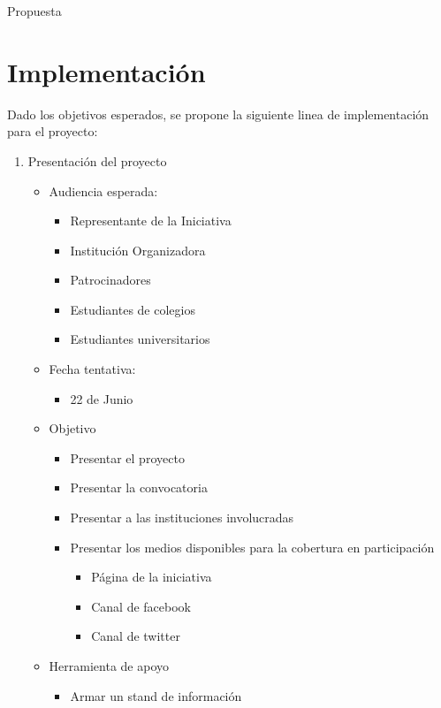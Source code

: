 \documentclass{article}
\begin{document}
Propuesta



\section{Implementación}

Dado los objetivos esperados, se propone la siguiente linea de implementación para el proyecto:

\begin{enumerate}
\item Presentación del proyecto
\begin{itemize}
\item Audiencia esperada:
\begin{itemize}
\item Representante de la Iniciativa
\item Institución Organizadora
\item Patrocinadores
\item Estudiantes de colegios
\item Estudiantes universitarios
\end{itemize}
\item Fecha tentativa:
\begin{itemize}
\item 22 de Junio
\end{itemize}
\item Objetivo
\begin{itemize}
\item Presentar el proyecto
\item Presentar la convocatoria
\item Presentar a las instituciones involucradas
\item Presentar los medios disponibles para la cobertura en participación
\begin{itemize}
\item Página de la iniciativa 
\item Canal de facebook
\item Canal de twitter
\end{itemize}
\end{itemize}
\item Herramienta de apoyo
\begin{itemize}
\item Armar un stand de información
\end{itemize}
\end{itemize}


\end{enumerate}
\end{document}

